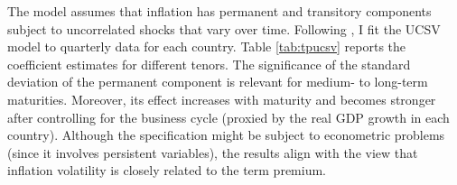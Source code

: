 {The model assumes that inflation has permanent and transitory components subject to uncorrelated shocks that vary over time.
Following \cite{Wright:2011}, I fit the UCSV model to quarterly data for each country.
Table \ref{tab:tpucsv} reports the coefficient estimates for different tenors.
The significance of the standard deviation of the permanent component is relevant for medium- to long-term maturities.
Moreover, its effect increases with maturity and becomes stronger after controlling for the business cycle (proxied by the real GDP growth in each country).
Although the specification might be subject to econometric problems (since it involves persistent variables), the results align with the view that inflation volatility is closely related to the term premium.

}
